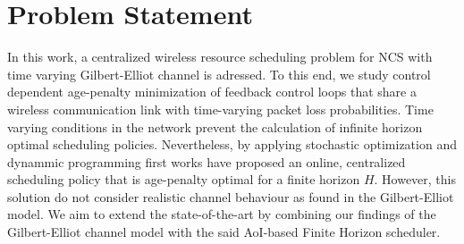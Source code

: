 
\section*{Problem Statement}
In this work, a centralized wireless resource scheduling problem for NCS with
time varying Gilbert-Elliot channel is adressed. To this end, we study control
dependent age-penalty minimization of feedback control loops that share a
wireless communication link with time-varying packet loss probabilities. Time
varying conditions in the network prevent the calculation of infinite horizon
optimal scheduling policies. Nevertheless, by applying stochastic optimization
and dynammic programming first works have proposed an online, centralized
scheduling policy that is age-penalty optimal for a finite horizon $H$. However,
this solution do not consider realistic channel behaviour as found in the
Gilbert-Elliot model. We aim to extend the state-of-the-art by combining our
findings of the Gilbert-Elliot channel model with the said AoI-based Finite
Horizon scheduler.

